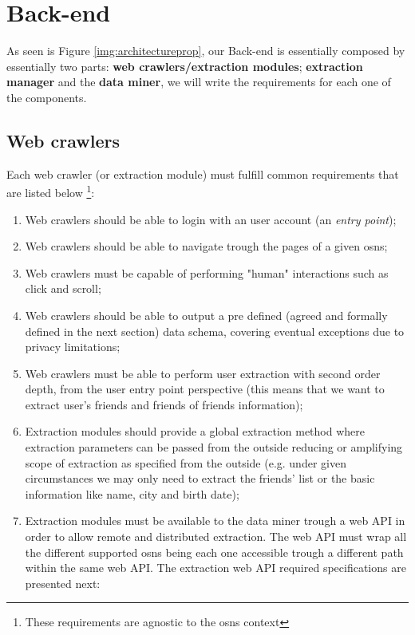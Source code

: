 \section{Back-end}
As seen is Figure \ref{img:architectureprop}, our Back-end is essentially composed by essentially two parts: \textbf{web crawlers/extraction modules}; \textbf{extraction manager} and the \textbf{data miner}, we will write the requirements for each one of the components.

\subsection{Web crawlers}
Each web crawler (or extraction module) must fulfill common requirements that are listed below \footnote{These requirements are agnostic to the \glspl{osn} context}:
\begin{enumerate}
    \item Web crawlers should be able to login with an user account (an \textit{entry point});
    \item Web crawlers should be able to navigate trough the pages of a given \glspl{osn};
    \item Web crawlers must be capable of performing "human" interactions such as click and scroll;
    \item Web crawlers should be able to output a pre defined (agreed and formally defined in the next section) data schema, covering eventual
    exceptions due to privacy limitations;
    \item Web crawlers must be able to perform user extraction with second order depth, from the user entry point perspective (this means that we want to extract user's friends and friends of friends information);
    \item Extraction modules should provide a global extraction method where extraction parameters can be passed from the outside reducing or amplifying scope of extraction as specified from the outside (e.g. under given circumstances we may only need to extract the friends' list or the basic information like name, city and birth date);
    \item Extraction modules must be available to the data miner trough a web API in order to allow remote and distributed extraction. The web API must wrap all the different supported \glspl{osn} being each one accessible trough a different path within the same web API. The extraction web API required specifications are presented next:
    \begin{itemize}

\end{itemize}
\end{enumerate}
